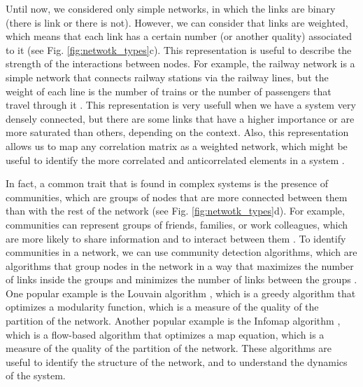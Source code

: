 Until now, we considered only simple networks, in which the links are binary (there is link or there is not). However, we can consider that links are weighted, which means that each link has a certain number (or another quality) associated to it \cite{barrat2004architecture} (see Fig. \ref{fig:netwotk_types}c). This representation is useful to describe the strength of the interactions between nodes. For example, the railway network is a simple network that connects railway stations via the railway lines, but the weight of each line is the number of trains or the number of passengers that travel through it \cite{latora-2002}. This representation is very usefull when we have a system very densely connected, but there are some links that have a higher importance or are more saturated than others, depending on the context. Also, this representation allows us to map any correlation matrix as a weighted network, which might be useful to identify the more correlated and anticorrelated elements in a system \cite{onnela-2003,tumminello-2005}.

In fact, a common trait that is found in complex systems is the presence of communities, which are groups of nodes that are more connected between them than with the rest of the network \cite{girvan-2002} (see Fig. \ref{fig:netwotk_types}d). For example, communities can represent groups of friends, families, or work colleagues, which are more likely to share information and to interact between them \cite{newman2001structure}. To identify communities in a network, we can use community detection algorithms, which are algorithms that group nodes in the network in a way that maximizes the number of links inside the groups and minimizes the number of links between the groups \cite{lancichinetti-2008,fortunato2010community}. One popular example is the Louvain algorithm \cite{blondel-2008}, which is a greedy algorithm that optimizes a modularity function, which is a measure of the quality of the partition of the network. Another popular example is the Infomap algorithm \cite{rosvall-2008}, which is a flow-based algorithm that optimizes a map equation, which is a measure of the quality of the partition of the network. These algorithms are useful to identify the structure of the network, and to understand the dynamics of the system.

